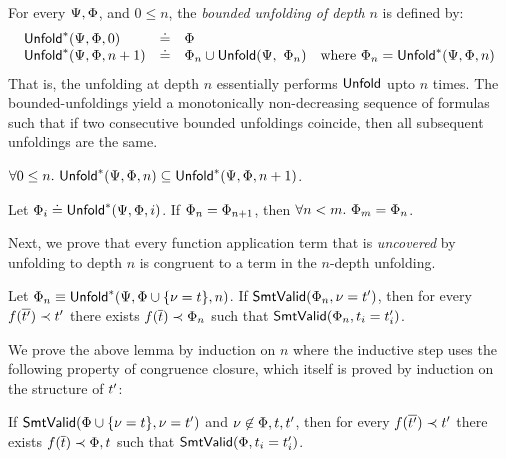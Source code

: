 %
For every $\Psi, \Phi$, and $0 \leq n$,
the \emph{bounded unfolding of depth} $n$ is
defined by:
%
$$\begin{array}{lcl}
  \mathsf{Unfold}^{*}(\Psi,\Phi,0)     & \doteq & \Phi \\
  \mathsf{Unfold}^{*}(\Psi,\Phi,n+1)   & \doteq & \Phi_n \cup \mathsf{Unfold}(\Psi,\ \Phi_n)
  \quad \mbox{where}\ \Phi_n = \mathsf{Unfold}^{*}(\Psi,\Phi,n)
\end{array}$$
%
That is, the unfolding at depth $n$ essentially
performs $\mathsf{Unfold}$ upto $n$ times.
%
The bounded-unfoldings yield a monotonically
non-decreasing sequence of formulas such that
if two consecutive bounded unfoldings coincide,
then all subsequent unfoldings are the same.
%

\begin{lemma} \label{lem:bounded:mono}
$\forall 0 \leq n.\ \mathsf{Unfold}^{*}(\Psi,\Phi,n) \subseteq \mathsf{Unfold}^{*}(\Psi,\Phi,n + 1)$.
\end{lemma}

\begin{lemma} \label{lem:bounded:fix}
Let $\Phi_i \doteq \mathsf{Unfold}^{*}(\Psi,\Phi,i)$.
If $\Phi_n = \Phi_{n+1}$,
then $\forall n < m.\ \Phi_m = \Phi_n$.
\end{lemma}

%
Next, we prove that every function application
term that is \emph{uncovered} by unfolding to
depth $n$ is congruent to a term in the $n$-depth
unfolding.


\begin{lemma} \label{lem:uncovering}
Let $\Phi_n \equiv \mathsf{Unfold}^{*}(\Psi,\Phi \cup \{ \nu = t \},n)$.
If   $\mathsf{SmtValid}(\Phi_n, \nu = t')$,
then for every $f({\overline{t'}}) \prec t'$
       there exists $f({\overline{t}}) \prec \Phi_n$
         such that $\mathsf{SmtValid}(\Phi_n, t_i = t'_i)$.
\end{lemma}

We prove the above lemma by induction on $n$
where the inductive step uses the following
property of congruence closure, which itself
is proved by induction on the structure of
$t'$:

\begin{lemma} \label{lem:congruence}
If   $\mathsf{SmtValid}(\Phi \cup \{ \nu = t \}, \nu = t')$
     and
     $\nu \not \in \Phi, t, t'$,
then for every $f({\overline{t'}}) \prec t'$
       there exists $f({\overline{t}}) \prec \Phi, t$
         such that $\mathsf{SmtValid}(\Phi, t_i = t'_i)$.
\end{lemma}


